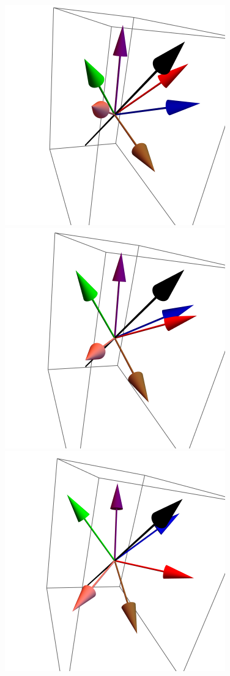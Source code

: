 \documentclass{article}
\begin{document}
\begin{figure}[ht]
\centering
\includegraphics[scale=0.22]{HVariedData/Pictures/101Dec1.png}
\includegraphics[scale=0.22]{HVariedData/Pictures/101Dec79.png}
\includegraphics[scale=0.22]{HVariedData/Pictures/101Dec125.png}

\end{figure}
\end{document}
